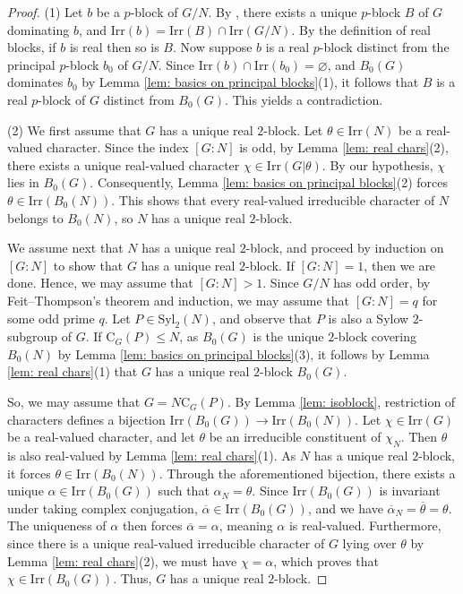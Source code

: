 \documentclass[10pt]{article}
\begin{document}
\begin{proof}
    (1) 
    Let $b$ be a $p$-block of $G/N$.
    By \cite[Page 199 and Theorems 9.9, 9.10]{navarro98}, 
    there exists a unique $p$-block $B$ of $G$ dominating $b$,
    and $\mathrm{Irr}(b)=\mathrm{Irr}(B)\cap \mathrm{Irr}(G/N)$. 
    By the definition of real blocks, 
    if $b$ is real then so is $B$.
     Now suppose $b$ is a real $p$-block distinct from the principal $p$-block $b_0$ of $G/N$.
    Since $\mathrm{Irr}(b)\cap \mathrm{Irr}(b_0)=\varnothing$,
    and $B_0(G)$ dominates $b_0$ by Lemma \ref{lem: basics on principal blocks}(1), it follows that $B$ is a real $p$-block of $G$ distinct from $B_0(G)$. 
    This yields a contradiction.

   

 

  (2) We first assume that $G$ has a unique real $2$-block. 
  Let $\theta \in \mathrm{Irr}(N)$ be a real-valued character. 
  Since the index $[G:N]$ is odd, 
  by Lemma \ref{lem: real chars}(2), there exists a unique real-valued character $\chi \in \mathrm{Irr}(G|\theta)$. 
  By our hypothesis, $\chi$ lies in $B_0(G)$. 
  Consequently, Lemma \ref{lem: basics on principal blocks}(2) forces 
  $\theta \in \mathrm{Irr}(B_0(N))$. 
  This shows that every real-valued irreducible character of $N$ belongs to $B_0(N)$, so $N$ has a unique real $2$-block.
  
  
  We assume next that $N$ has a unique real $2$-block,
  and proceed by induction on $[G:N]$ to show that $G$ has a unique real $2$-block.
  If $[G:N]=1$, then we are done. 
  Hence, we may assume that $[G:N]>1$.
  Since $G/N$ has odd order, by Feit--Thompson's theorem and induction, 
  we may assume that $[G:N]=q$ for some odd prime $q$.
  Let $P\in \mathrm{Syl}_{2}(N)$, and observe that $P$ is also a Sylow $2$-subgroup of $G$.
  If $\mathrm{C}_{G}(P)\leq N$,
  as $B_0(G)$ is the unique $2$-block covering $B_0(N)$ by Lemma \ref{lem: basics on principal blocks}(3),
  it follows by Lemma \ref{lem: real chars}(1) that $G$ has a unique real $2$-block $B_0(G)$.
 
  So, we may assume that $G=N \mathrm{C}_{G}(P)$.
  By Lemma \ref{lem: isoblock}, restriction of characters defines a bijection $\mathrm{Irr}(B_0(G))\to\mathrm{Irr}(B_0(N))$. 
  Let $\chi\in \mathrm{Irr}(G)$ be a real-valued character, and let $\theta$ be an irreducible constituent of $\chi_N$.
  Then $\theta$ is also real-valued by Lemma \ref{lem: real chars}(1).
  As $N$ has a unique real $2$-block, it forces $\theta \in \mathrm{Irr}(B_0(N))$.
  Through the aforementioned bijection, there exists a unique $\alpha \in \mathrm{Irr}(B_0(G))$ such that $\alpha_N = \theta$. 
  Since $\mathrm{Irr}(B_0(G))$ is invariant under taking complex conjugation, $\overline{\alpha} \in \mathrm{Irr}(B_0(G))$, and we have $\overline{\alpha}_N = \overline{\theta} = \theta$. 
  The uniqueness of $\alpha$ then forces $\overline{\alpha} = \alpha$, meaning $\alpha$ is real-valued. 
  Furthermore, since there is a unique real-valued irreducible character of $G$ lying over $\theta$ by Lemma \ref{lem: real chars}(2), 
  we must have $\chi = \alpha$, which proves that $\chi \in \mathrm{Irr}(B_0(G))$. 
  Thus, $G$ has a unique real $2$-block. 


\end{proof}
\end{document}
